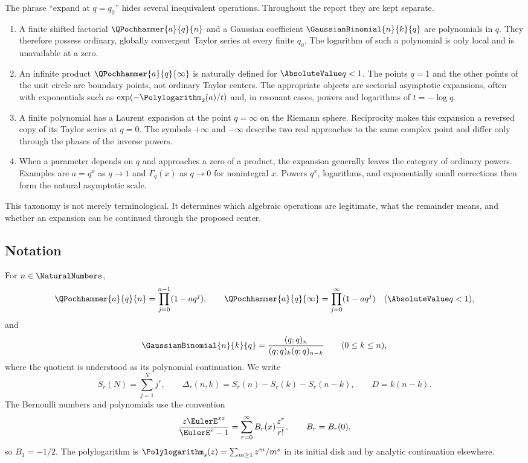 \documentclass[11pt,oneside]{article}
\theoremstyle{definition}
\theoremstyle{remark}
\let\reportsubsection\subsection
\let\section\reportsubsection
\begin{document}
The phrase ``expand at $q=q_0$'' hides several inequivalent operations.
Throughout the report they are kept separate.

\begin{enumerate}[label=\textup{(\roman*)}]
\item A finite shifted factorial $\QPochhammer{a}{q}{n}$ and a Gaussian coefficient
      $\GaussianBinomial{n}{k}{q}$ are polynomials in $q$.  They therefore possess ordinary,
      globally convergent Taylor series at every finite $q_0$.  The logarithm
      of such a polynomial is only local and is unavailable at a zero.
\item An infinite product $\QPochhammer{a}{q}{\infty}$ is naturally defined for
      $\AbsoluteValue q<1$.  The points $q=1$ and the other points of the unit circle are
      boundary points, not ordinary Taylor centers.  The appropriate objects
      are sectorial asymptotic expansions, often with exponentials such as
      $\exp(-\Polylogarithm_2(a)/t)$ and, in resonant cases, powers and logarithms of
      $t=-\log q$.
\item A finite polynomial has a Laurent expansion at the point $q=\infty$ on
      the Riemann sphere.  Reciprocity makes this expansion a reversed copy of
      its Taylor series at $q=0$.  The symbols $+\infty$ and $-\infty$ describe
      two real approaches to the same complex point and differ only through
      the phases of the inverse powers.
\item When a parameter depends on $q$ and approaches a zero of a product, the
      expansion generally leaves the category of ordinary powers.  Examples
      are $a=q^x$ as $q\to1$ and $\Gamma_q(x)$ as $q\to0$ for nonintegral $x$.
      Powers $q^x$, logarithms, and exponentially small corrections then form
      the natural asymptotic scale.
\end{enumerate}

This taxonomy is not merely terminological.  It determines which algebraic
operations are legitimate, what the remainder means, and whether an expansion
can be continued through the proposed center.

\section{Notation}

For $n\in\NaturalNumbers$,
\[
 \QPochhammer{a}{q}{n}=\prod_{j=0}^{n-1}(1-aq^j),
 \qquad
 \QPochhammer{a}{q}{\infty}=\prod_{j=0}^{\infty}(1-aq^j)\quad(\AbsoluteValue q<1),
\]
and
\[
 \GaussianBinomial{n}{k}{q}=\frac{(q;q)_n}{(q;q)_k(q;q)_{n-k}}
 \qquad(0\le k\le n),
\]
where the quotient is understood as its polynomial continuation.  We write
\[
 S_r(N)=\sum_{j=1}^{N}j^r,
 \qquad
 \Delta_r(n,k)=S_r(n)-S_r(k)-S_r(n-k),
 \qquad
 D=k(n-k).
\]
The Bernoulli numbers and polynomials use the convention
\[
 \frac{z\EulerE^{xz}}{\EulerE^z-1}
 =\sum_{r=0}^{\infty}B_r(x)\frac{z^r}{r!},
 \qquad B_r=B_r(0),
\]
so $B_1=-1/2$.  The polylogarithm is
\(
\Polylogarithm_s(z)=\sum_{m\ge1}z^m/m^s
\)
in its initial disk and by analytic continuation elsewhere.
\end{document}

